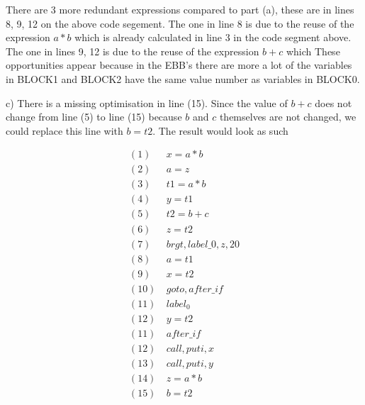 \documentclass{article}
\begin{document}
There are 3 more redundant expressions compared to part (a), these are in
lines 8, 9, 12 on the above code segement.
The one in line 8 is due to the reuse of the expression $a * b$ which
is already calculated in line 3 in the code segment above.
The one in lines 9, 12 is due to the reuse of the expression $b + c$ which
These opportunities appear
because in the EBB's there are more a lot of the variables in BLOCK1
and BLOCK2 have the same value number as variables in BLOCK0.

c) There is a missing optimisation in line (15). Since the value of
$b + c$ does not change from line (5) to line (15) because $b$ and $c$
themselves are not changed, we could replace this line
with $b = t2$. The result would look as such

\begin{align*}
    (1)\   & x = a * b             \\
    (2)\   & a = z                 \\
    (3)\   & t1 = a * b            \\
    (4)\   & y = t1                \\
    (5)\   & t2 = b + c            \\
    (6)\   & z = t2                \\
    (7)\   & brgt, label\_0, z, 20 \\
    (8)\   & a = t1                \\
    (9)\   & x = t2                \\
    (10)\  & goto, after\_if       \\
    (11)\  & label_0               \\
    (12)\  & y = t2                \\
    (11)\  & after\_if             \\
    (12)\  & call, puti, x         \\
    (13)\  & call, puti, y         \\
    (14)\  & z = a * b             \\
    (15)\  & b = t2                \\
\end{align*}
\end{document}
